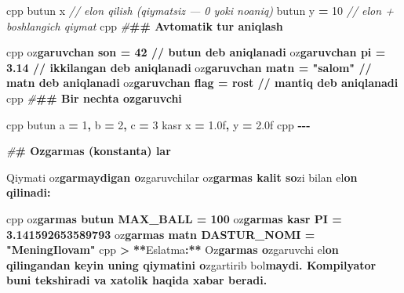 \documentclass[a4paper,11pt,twoside,openright]{book}
\newenvironment{Shaded}{\begin{snugshade}}{\end{snugshade}}
\newcommand{\BuiltInTok}[1]{#1}
\newcommand{\CharTok}[1]{\textcolor[rgb]{0.31,0.60,0.02}{#1}}
\newcommand{\CommentTok}[1]{\textcolor[rgb]{0.56,0.35,0.01}{\textit{#1}}}
\newcommand{\DecValTok}[1]{\textcolor[rgb]{0.00,0.00,0.81}{#1}}
\newcommand{\ErrorTok}[1]{\textcolor[rgb]{0.64,0.00,0.00}{\textbf{#1}}}
\newcommand{\FloatTok}[1]{\textcolor[rgb]{0.00,0.00,0.81}{#1}}
\newcommand{\NormalTok}[1]{#1}
\newcommand{\OperatorTok}[1]{\textcolor[rgb]{0.81,0.36,0.00}{\textbf{#1}}}
\newcommand{\PreprocessorTok}[1]{\textcolor[rgb]{0.56,0.35,0.01}{\textit{#1}}}
\begin{document}
\begin{Shaded}
\begin{Highlighting}[]
\ErrorTok{\textasciigrave{}\textasciigrave{}\textasciigrave{}}\NormalTok{cpp}
\NormalTok{butun x                }\CommentTok{// e\textquotesingle{}lon qilish (qiymatsiz — 0 yoki noaniq)}
\NormalTok{butun y }\OperatorTok{=} \DecValTok{10}           \CommentTok{// e\textquotesingle{}lon + boshlang\textquotesingle{}ich qiymat}
\ErrorTok{\textasciigrave{}\textasciigrave{}\textasciigrave{}}\NormalTok{cpp}
\PreprocessorTok{\#}\ErrorTok{\#\# Avtomatik tur aniqlash}

\ErrorTok{\textasciigrave{}\textasciigrave{}\textasciigrave{}}\NormalTok{cpp}
\NormalTok{o}\CharTok{\textquotesingle{}z}\ErrorTok{garuvchan son = 42          // butun deb aniqlanadi}
\NormalTok{o}\CharTok{\textquotesingle{}z}\ErrorTok{garuvchan pi = 3.14         // ikkilangan deb aniqlanadi}
\NormalTok{o}\CharTok{\textquotesingle{}z}\ErrorTok{garuvchan matn = "salom"    // matn deb aniqlanadi}
\NormalTok{o}\CharTok{\textquotesingle{}z}\ErrorTok{garuvchan flag = rost       // mantiq deb aniqlanadi}
\ErrorTok{\textasciigrave{}\textasciigrave{}\textasciigrave{}}\NormalTok{cpp}
\PreprocessorTok{\#}\ErrorTok{\#\# Bir nechta o\textquotesingle{}zgaruvchi}

\ErrorTok{\textasciigrave{}\textasciigrave{}\textasciigrave{}}\NormalTok{cpp}
\NormalTok{butun a }\OperatorTok{=} \DecValTok{1}\OperatorTok{,}\NormalTok{ b }\OperatorTok{=} \DecValTok{2}\OperatorTok{,}\NormalTok{ c }\OperatorTok{=} \DecValTok{3}
\NormalTok{kasr x }\OperatorTok{=} \FloatTok{1.0}\BuiltInTok{f}\OperatorTok{,}\NormalTok{ y }\OperatorTok{=} \FloatTok{2.0}\BuiltInTok{f}
\ErrorTok{\textasciigrave{}\textasciigrave{}\textasciigrave{}}\NormalTok{cpp}
\OperatorTok{{-}{-}{-}}

\PreprocessorTok{\#}\ErrorTok{\# O\textquotesingle{}zgarmas (konstanta) lar}

\NormalTok{Qiymati o}\CharTok{\textquotesingle{}z}\ErrorTok{garmaydigan o}\CharTok{\textquotesingle{}}\NormalTok{zgaruvchilar }\ErrorTok{\textasciigrave{}}\NormalTok{o}\CharTok{\textquotesingle{}z}\ErrorTok{garmas\textasciigrave{} kalit so}\CharTok{\textquotesingle{}}\NormalTok{zi bilan e}\CharTok{\textquotesingle{}l}\ErrorTok{on qilinadi:}

\ErrorTok{\textasciigrave{}\textasciigrave{}\textasciigrave{}}\NormalTok{cpp}
\NormalTok{o}\CharTok{\textquotesingle{}z}\ErrorTok{garmas butun MAX\_BALL = 100}
\NormalTok{o}\CharTok{\textquotesingle{}z}\ErrorTok{garmas kasr PI = 3.141592653589793}
\NormalTok{o}\CharTok{\textquotesingle{}z}\ErrorTok{garmas matn DASTUR\_NOMI = "MeningIlovam"}
\ErrorTok{\textasciigrave{}\textasciigrave{}\textasciigrave{}}\NormalTok{cpp}
\OperatorTok{\textgreater{}} \OperatorTok{**}\NormalTok{Eslatma}\OperatorTok{:**}\NormalTok{ O}\CharTok{\textquotesingle{}z}\ErrorTok{garmas o}\CharTok{\textquotesingle{}}\NormalTok{zgaruvchi e}\CharTok{\textquotesingle{}l}\ErrorTok{on qilingandan keyin uning qiymatini o}\CharTok{\textquotesingle{}}\NormalTok{zgartirib bo}\CharTok{\textquotesingle{}l}\ErrorTok{maydi. Kompilyator buni tekshiradi va xatolik haqida xabar beradi.}


\end{Highlighting}
\end{Shaded}
\end{document}

